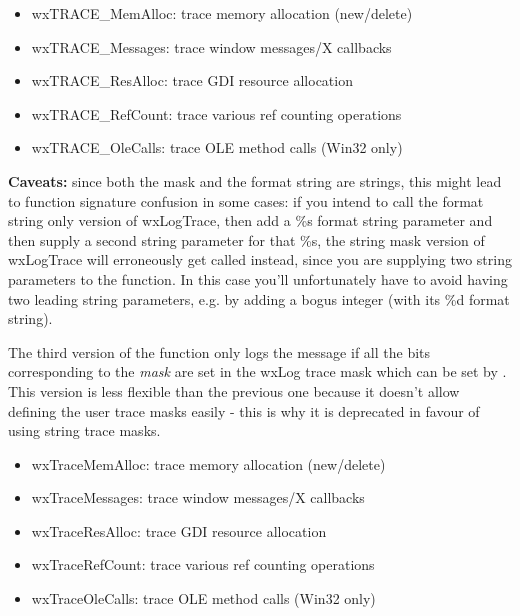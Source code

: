 \begin{itemize}\itemsep=0pt
\item wxTRACE\_MemAlloc: trace memory allocation (new/delete)
\item wxTRACE\_Messages: trace window messages/X callbacks
\item wxTRACE\_ResAlloc: trace GDI resource allocation
\item wxTRACE\_RefCount: trace various ref counting operations
\item wxTRACE\_OleCalls: trace OLE method calls (Win32 only)
\end{itemize}

{\bf Caveats:} since both the mask and the format string are strings,
this might lead to function signature confusion in some cases:
if you intend to call the format string only version of wxLogTrace,
then add a \%s format string parameter and then supply a second string parameter for that \%s, the string mask version of wxLogTrace will erroneously get called instead, since you are supplying two string parameters to the function.
In this case you'll unfortunately have to avoid having two leading
string parameters, e.g. by adding a bogus integer (with its \%d format string).

The third version of the function only logs the message if all the bits
corresponding to the {\it mask} are set in the wxLog trace mask which can be
set by . This version is less
flexible than the previous one because it doesn't allow defining the user
trace masks easily - this is why it is deprecated in favour of using string
trace masks.

\begin{itemize}\itemsep=0pt
\item wxTraceMemAlloc: trace memory allocation (new/delete)
\item wxTraceMessages: trace window messages/X callbacks
\item wxTraceResAlloc: trace GDI resource allocation
\item wxTraceRefCount: trace various ref counting operations
\item wxTraceOleCalls: trace OLE method calls (Win32 only)
\end{itemize}


\label{wxsafeshowmessage}


